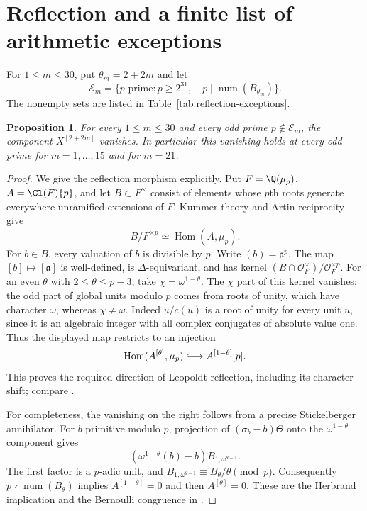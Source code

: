 \documentclass[11pt]{article}
\newtheorem{proposition}[theorem]{Proposition}
\theoremstyle{definition}\newtheorem{definition}[theorem]{Definition}
\begin{document}
\section{Reflection and a finite list of arithmetic exceptions}
For $1\leq m\leq30$, put $\theta_m=2+2m$ and let
\[
 \mathcal E_m=\{p\text{ prime}:p\geq2^{31},\quad
             p\mid\operatorname{num}(B_{\theta_m})\}.
\]
The nonempty sets are listed in Table~\ref{tab:reflection-exceptions}.

\begin{proposition}\label{prop:reflection-exceptions}
For every $1\leq m\leq30$ and every odd prime
$p\notin\mathcal E_m$, the component $X^{[2+2m]}$ vanishes.
In particular this vanishing holds at every odd prime for
$m=1,\ldots,15$ and for $m=21$.
\end{proposition}
\begin{proof}
We give the reflection morphism explicitly. Put $F=\Q(\mu_p)$,
$A=\Cl(F)\{p\}$, and let $B\subset F^\times$ consist of elements
whose $p$th roots generate everywhere unramified extensions of $F$.
Kummer theory and Artin reciprocity give
\[
 B/F^{\times p}\simeq\operatorname{Hom}(A,\mu_p).
\]
For $b\in B$, every valuation of $b$ is divisible by $p$.
Write $(b)=\mathfrak a^p$. The map $[b]\mapsto[\mathfrak a]$
is well-defined, is $\Delta$-equivariant, and has kernel
$(B\cap\mathcal O_F^\times)/\mathcal O_F^{\times p}$.
For an even $\theta$ with $2\leq\theta\leq p-3$, take
$\chi=\omega^{1-\theta}$. The $\chi$ part of this kernel vanishes:
the odd part of global units modulo $p$ comes from roots of unity,
which have character $\omega$, whereas $\chi\ne\omega$.
Indeed $u/c(u)$ is a root of unity for every unit $u$, since it is
an algebraic integer with all complex conjugates of absolute value one.
Thus the displayed map restricts to an injection
\[
 \operatorname{Hom}(A^{[\theta]},\mu_p)
       \lhook\joinrel\longrightarrow A^{[1-\theta]}[p].
\]
This proves the required direction of Leopoldt reflection, including
its character shift; compare \cite[Theorem~4.4.2 and
Corollary~4.4.4]{SharifiIwa}.

For completeness, the vanishing on the right follows from a precise
Stickelberger annihilator. For $b$ primitive modulo $p$, projection
of $(\sigma_b-b)\Theta$ onto the $\omega^{1-\theta}$ component gives
\[
 (\omega^{1-\theta}(b)-b)B_{1,\omega^{\theta-1}}.
\]
The first factor is a $p$-adic unit, and
$B_{1,\omega^{\theta-1}}\equiv B_\theta/\theta\pmod p$.
Consequently $p\nmid\operatorname{num}(B_\theta)$ implies
$A^{[1-\theta]}=0$ and then $A^{[\theta]}=0$.
These are the Herbrand implication and the Bernoulli congruence in
\cite[Theorem~4.5.7 and Corollary~5.4.15]{SharifiIwa}.


\end{proof}
\end{document}
